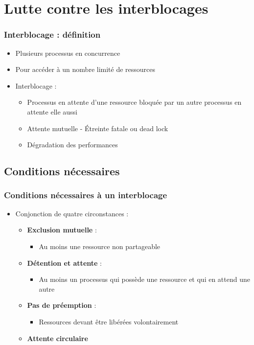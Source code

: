 \section{Lutte contre les interblocages}

\begin{frame}
\frametitle{Interblocage : définition}
\begin{itemize}
\item Plusieurs processus en concurrence
\item Pour accéder à un nombre limité de ressources
\item Interblocage :
\begin{itemize}
\item Processus en attente d’une ressource bloquée par un autre processus en attente elle aussi
\item Attente mutuelle - Étreinte fatale ou dead lock
\item Dégradation des performances
\end{itemize}
\end{itemize}
\end{frame}

\subsection{Conditions nécessaires}
\begin{frame}
\frametitle{Conditions nécessaires à un interblocage}
\begin{itemize}
\item Conjonction de quatre circonstances :
\begin{itemize}
\item \textbf{Exclusion mutuelle} :
\begin{itemize}
\item Au moins une ressource non partageable
\end{itemize}
\item \textbf{Détention et attente} :
\begin{itemize}
\item Au moins un processus qui possède une ressource et qui en attend une autre
\end{itemize}
\item \textbf{Pas de préemption} :
\begin{itemize}
\item Ressources devant être libérées volontairement
\end{itemize}
\item \textbf{Attente circulaire}
\end{itemize}
\end{itemize}
\end{frame}

